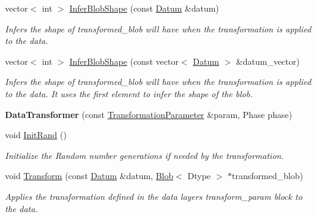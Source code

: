 \begin{DoxyCompactItemize}
vector$<$ int $>$ \mbox{\hyperlink{classcaffe_1_1_data_transformer_a1e43b0fb80cded5bb854e1a06004bebf}{Infer\+Blob\+Shape}} (const \mbox{\hyperlink{classcaffe_1_1_datum}{Datum}} \&datum)
\begin{DoxyCompactList}\small\item\em Infers the shape of transformed\+\_\+blob will have when the transformation is applied to the data. \end{DoxyCompactList}\item 
vector$<$ int $>$ \mbox{\hyperlink{classcaffe_1_1_data_transformer_ac829dd6448dcce67acb1e22a2554db4b}{Infer\+Blob\+Shape}} (const vector$<$ \mbox{\hyperlink{classcaffe_1_1_datum}{Datum}} $>$ \&datum\+\_\+vector)
\begin{DoxyCompactList}\small\item\em Infers the shape of transformed\+\_\+blob will have when the transformation is applied to the data. It uses the first element to infer the shape of the blob. \end{DoxyCompactList}\item 
\mbox{\label{classcaffe_1_1_data_transformer_ae598f617042b2d68f4bab0dd3bd542f0}} 
{\bfseries Data\+Transformer} (const \mbox{\hyperlink{classcaffe_1_1_transformation_parameter}{Transformation\+Parameter}} \&param, Phase phase)
\item 
\mbox{\label{classcaffe_1_1_data_transformer_a6d807c7dc250e66b62d97d9847278e68}} 
void \mbox{\hyperlink{classcaffe_1_1_data_transformer_a6d807c7dc250e66b62d97d9847278e68}{Init\+Rand}} ()
\begin{DoxyCompactList}\small\item\em Initialize the Random number generations if needed by the transformation. \end{DoxyCompactList}\item 
void \mbox{\hyperlink{classcaffe_1_1_data_transformer_a1626db49587d506a91e7b70373ace816}{Transform}} (const \mbox{\hyperlink{classcaffe_1_1_datum}{Datum}} \&datum, \mbox{\hyperlink{classcaffe_1_1_blob}{Blob}}$<$ Dtype $>$ $\ast$transformed\+\_\+blob)
\begin{DoxyCompactList}\small\item\em Applies the transformation defined in the data layer\textquotesingle{}s transform\+\_\+param block to the data. \end{DoxyCompactList}\item 

\end{DoxyCompactItemize}
